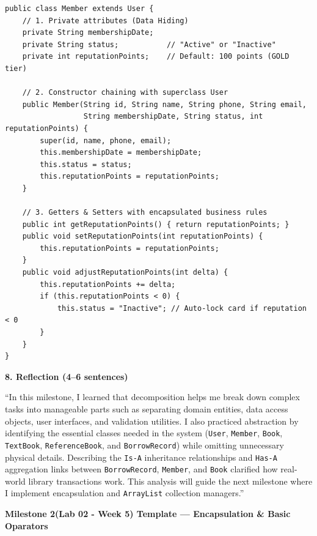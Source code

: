 \documentclass[12pt,a4paper]{article}
\begin{document}
\begin{lstlisting}[style=javastyle]
public class Member extends User {
    // 1. Private attributes (Data Hiding)
    private String membershipDate;
    private String status;           // "Active" or "Inactive"
    private int reputationPoints;    // Default: 100 points (GOLD tier)

    // 2. Constructor chaining with superclass User
    public Member(String id, String name, String phone, String email,
                  String membershipDate, String status, int reputationPoints) {
        super(id, name, phone, email);
        this.membershipDate = membershipDate;
        this.status = status;
        this.reputationPoints = reputationPoints;
    }

    // 3. Getters & Setters with encapsulated business rules
    public int getReputationPoints() { return reputationPoints; }
    public void setReputationPoints(int reputationPoints) {
        this.reputationPoints = reputationPoints;
    }
    public void adjustReputationPoints(int delta) {
        this.reputationPoints += delta;
        if (this.reputationPoints < 0) {
            this.status = "Inactive"; // Auto-lock card if reputation < 0
        }
    }
}
\end{lstlisting}

\textbf{8. Reflection (4--6 sentences)}

``In this milestone, I learned that decomposition helps me break down complex tasks into manageable parts such as separating domain entities, data access objects, user interfaces, and validation utilities. I also practiced abstraction by identifying the essential classes needed in the system (\texttt{User}, \texttt{Member}, \texttt{Book}, \texttt{TextBook}, \texttt{ReferenceBook}, and \texttt{BorrowRecord}) while omitting unnecessary physical details. Describing the \texttt{Is-A} inheritance relationships and \texttt{Has-A} aggregation links between \texttt{BorrowRecord}, \texttt{Member}, and \texttt{Book} clarified how real-world library transactions work. This analysis will guide the next milestone where I implement encapsulation and \texttt{ArrayList} collection managers.''

\vspace{0.5cm}

{\fontsize{16}{20}\selectfont\bfseries Milestone 2(Lab 02 - Week 5) Template --- Encapsulation \& Basic Oparators\par}
\end{document}
